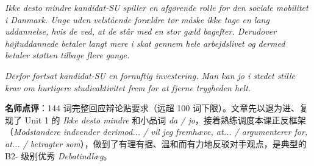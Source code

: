 \begin{answerbox}
\textit{Ikke desto mindre  kandidat-SU spiller en afgørende rolle for den sociale mobilitet i Danmark. Unge uden velstående forældre tør måske ikke tage en lang uddannelse, hvis de ved, at de står med en stor gæld bagefter. Derudover  højtuddannede betaler langt mere i skat gennem hele arbejdslivet og dermed betaler støtten tilbage flere gange.}

\textit{Derfor  fortsat kandidat-SU  en fornuftig investering. Man kan jo i stedet stille krav om hurtigere studieaktivitet frem for at fjerne trygheden helt.}

\small\textbf{名师点评}：144 词完整回应辩论贴要求（远超 100 词下限）。文章先以退为进、复现了 Unit 1 的 \textit{Ikke desto mindre} 和小品词 \textit{da / jo}，接着熟练调度本课正反框架（\textit{Modstandere indvender derimod... / vil jeg fremhæve, at... / argumenterer for, at... / betragter som}），做到了有理有据、温和而有力地反驳对手观点，是典型的 B2- 级别优秀 \textit{Debatindlæg}。
\end{answerbox}